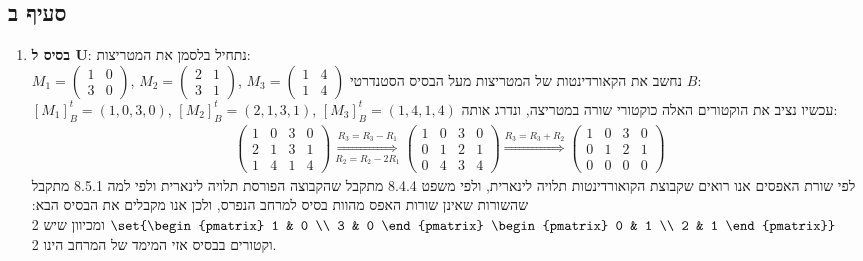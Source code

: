 \documentclass{article}
\DeclarePairedDelimiter\set\{\}
\begin{document}
	\pagebreak
	\subsection*{סעיף ב}

	\begin{enumerate}
		\item \textbf{בסיס ל U}: 	נתחיל בלסמן את המטריצות: \\
		$M_1 = \begin{pmatrix}
			1 & 0 \\
			3 & 0
		\end{pmatrix}$,
		$M_2 = \begin{pmatrix}
			2 & 1 \\
			3 & 1
		\end{pmatrix}$,
		$M_3 = \begin{pmatrix}
			1 & 4 \\
			1 & 4
		\end{pmatrix}$
		נחשב את הקאורדינטות של המטריצות מעל הבסיס הסטנדרטי $B$: \\
		$[M_1]_B^t = (1,0,3,0)$, $[M_2]_B^t = (2,1,3,1)$, $[M_3]_B^t = (1,4,1,4)$
		עכשיו נציב את הוקטורים האלה כוקטורי שורה במטריצה, ונדרג אותה:
		\begin{align*}
			\begin{pmatrix}
				1 & 0 & 3 & 0 \\
				2 & 1 & 3 & 1 \\
				1 & 4 & 1 & 4
			\end{pmatrix} \overset{R_3=R_3-R_1}{\underset{R_2=R_2-2R_1}\Rightarrow}
			\begin{pmatrix}
				1 & 0 & 3 & 0 \\
				0 & 1 & 2 & 1 \\
				0 & 4 & 3 & 4
			\end{pmatrix} \overset{R_3 = R_3 + R_2}\Rightarrow
			\begin{pmatrix}
				1 & 0 & 3 & 0 \\
				0 & 1 & 2 & 1 \\
				0 & 0 & 0 & 0
			\end{pmatrix}
		\end{align*}
		לפי שורת האפסים אנו רואים שקבוצת הקואורדינטות תלויה לינארית, ולפי משפט 8.4.4 מתקבל שהקבוצה הפורסת תלויה לינארית
		ולפי למה 8.5.1 מתקבל שהשורות שאינן שורות האפס מהוות בסיס למרחב הנפרס, ולכן אנו מקבלים את הבסיס הבא:
		$\set{\begin{pmatrix}
			1 & 0 \\
			3 & 0
		\end{pmatrix}
		\begin{pmatrix}
			0 & 1 \\
			2 & 1
		\end{pmatrix}}$
		ומכיוון שיש 2 וקטורים בבסיס אזי המימד של המרחב הינו 2.


\end{enumerate}
\end{document}
